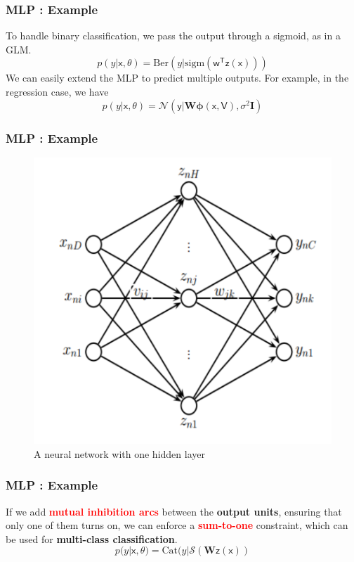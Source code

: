 \documentclass{beamer}
\begin{document}
\begin{frame}
	\frametitle{MLP : Example}
	To handle binary classification, we pass the output through a sigmoid, as in a GLM.
	$$p(y|\bm{\mathsf{x,\theta}}) = \mathrm{Ber}(y|\mathrm{sigm}(\bm{\mathsf{w^{T}z(x)}}))$$
	We can easily extend the MLP to predict multiple outputs. For example, in the regression case, we have
	$$p(y|\bm{\mathsf{x,\theta}}) = \mathcal{N}(\bm{\mathsf{y}|W\phi} (\bm{\mathsf{x,V}}),\sigma^{2}\bm{I})$$
	
\end{frame}



\begin{frame}
    \frametitle{MLP : Example}
	\begin{figure}
    	\includegraphics[scale=.4]{./Images/nn.pdf}
    	\caption{A neural network with one hidden layer}
	\end{figure}
\end{frame}


\begin{frame}
    \frametitle{MLP : Example}
	
	If we add \textbf{\textcolor{red}{mutual inhibition arcs}} between the \textbf{output units}, ensuring that only one of them turns on, we can enforce a \textbf{\textcolor{red}{sum-to-one}} constraint, which can be used for \textbf{multi-class classification}. 
	$$ p(y|\bm{\mathsf{x, \theta}}) = \mathrm{Cat}(y|\mathcal{S}(\bm{W\mathsf{z}(\mathsf{x})})$$

\end{frame}
\end{document}
